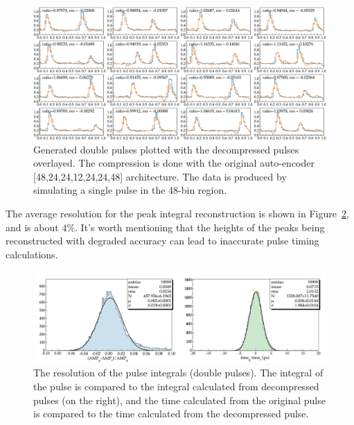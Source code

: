 \begin{figure}[h!]
\centering
\includegraphics[width=0.9\columnwidth]{results_dp_48.pdf}
\caption{Generated double pulses plotted with the decompressed pulses overlayed. The compression is done with the original auto-encoder [48,24,24,12,24,24,48] architecture. The data is produced by simulating a single pulse in the 48-bin region.} 
\label{fig:results_dp_48}
\end{figure}

The average resolution for the peak integral reconstruction is shown in Figure~\ref{fig:results_dp_48_res}, and is about $4\%$. It's worth mentioning that the heights of the peaks being reconstructed with degraded accuracy can lead to inaccurate pulse timing calculations.

\begin{figure}[h!]
\centering
\includegraphics[width=0.9\columnwidth]{out_evaluate_csv_double_24.pdf}
\caption{The resolution of the pulse integrals (double pulses). The integral of the pulse is compared to the integral calculated from decompressed pulses (on the right), and the time calculated from the original pulse is compared to the time calculated from the decompressed pulse.} 
\label{fig:results_dp_48_res}
\end{figure}

